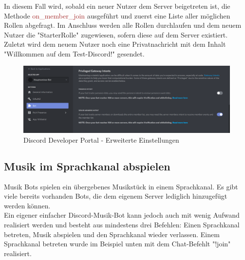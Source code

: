 \documentclass[sigplan,screen]{acmart}
\begin{document}
In diesem Fall wird, sobald ein neuer Nutzer dem Server beigetreten ist, die Methode \textcolor{brown}{on\_member\_join} ausgeführt und zuerst eine Liste aller möglichen Rollen abgefragt.
Im Anschluss werden alle Rollen durchlaufen und dem neuem Nutzer die "StarterRolle" zugewiesen, sofern diese auf dem Server existiert. Zuletzt wird dem neuem Nutzer noch eine Privatnachricht mit dem Inhalt "Willkommen auf dem Test-Discord!" gesendet.

\begin{figure}[h]
  \centering
  \includegraphics[width=\linewidth]{discord_member}
  \caption{Discord Developer Portal - Erweiterte Einstellungen}
\end{figure}


\subsection{Musik im Sprachkanal abspielen}
Musik Bots spielen ein übergebenes Musikstück in einem Sprachkanal. Es gibt viele bereits vorhanden Bots, die dem eigenem Server lediglich hinzugefügt werden können. \\
\noindent Ein eigener einfacher Discord-Musik-Bot kann jedoch auch mit wenig Aufwand realisiert werden und besteht aus mindestens drei Befehlen: Einen Sprachkanal betreten, Musik abspielen und den Sprachkanal wieder verlassen. Einem Sprachkanal betreten wurde im Beispiel unten mit dem Chat-Befehlt "!join" realisiert. 
\end{document}

